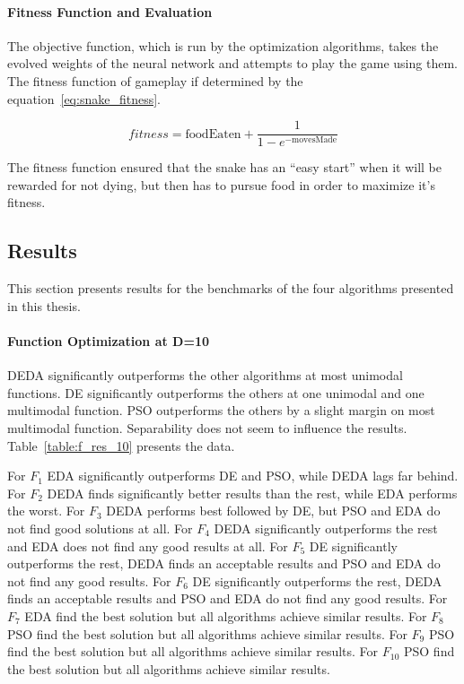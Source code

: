 \paragraph{Fitness Function and Evaluation}

The objective function, which is run by the optimization algorithms, takes the evolved weights of the neural network and attempts to play the game using them. The fitness function of gameplay if determined by the equation~\ref{eq:snake_fitness}.

\begin{equation} \label{eq:snake_fitness}
  fitness = \text{foodEaten} + \frac{1}{1-e^{-\text{movesMade}}}
\end{equation}

The fitness function ensured that the snake has an ``easy start'' when it will be rewarded for not dying, but then has to pursue food in order to maximize it's fitness.


\subsection{Results}

This section presents results for the benchmarks of the four algorithms presented in this thesis.

\paragraph{Function Optimization at D=10}
DEDA significantly outperforms the other algorithms at most unimodal functions. DE significantly outperforms the others at one unimodal and one multimodal function. PSO outperforms the others by a slight margin on most multimodal function. Separability does not seem to influence the results. Table~\ref{table:f_res_10} presents the data.

For $F_1$ EDA significantly outperforms DE and PSO, while DEDA lags far behind. For $F_2$ DEDA finds significantly better results than the rest, while EDA performs the worst. For $F_3$ DEDA performs best followed by DE, but PSO and EDA do not find good solutions at all. For $F_4$ DEDA significantly outperforms the rest and EDA does not find any good results at all. For $F_5$ DE significantly outperforms the rest, DEDA finds an acceptable results and PSO and EDA do not find any good results. For $F_6$ DE significantly outperforms the rest, DEDA finds an acceptable results and PSO and EDA do not find any good results. For $F_7$ EDA find the best solution but all algorithms achieve similar results. For $F_8$ PSO find the best solution but all algorithms achieve similar results. For $F_9$ PSO find the best solution but all algorithms achieve similar results. For $F_{10}$ PSO find the best solution but all algorithms achieve similar results.

